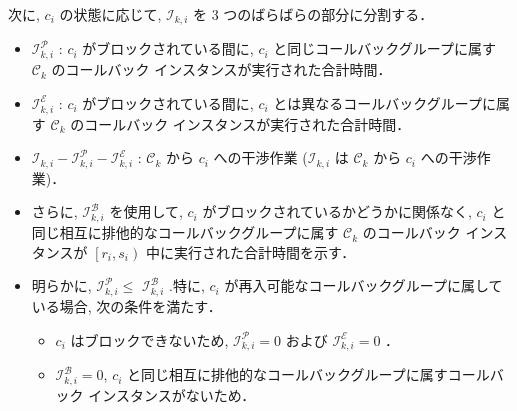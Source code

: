 \begin{frame}{}
    次に, $c_{i}$ の状態に応じて, $\mathcal{I}_{k, i}$ を 3 つのばらばらの部分に分割する．
    \begin{itemize}
        \item  $\mathcal{I}_{k, i}^{\mathcal{P}}$ : $c_{i}$ がブロックされている間に, $c_{i}$ と同じコールバックグループに属す $\mathcal{C}_{k}$ のコールバック インスタンスが実行された合計時間．

        \item  $\mathcal{I}_{k, i}^{\mathcal{E}}$ : $c_{i}$ がブロックされている間に, $c_{i}$ とは異なるコールバックグループに属す $\mathcal{C}_{k}$ のコールバック インスタンスが実行された合計時間．

        \item  $\mathcal{I}_{k, i}-\mathcal{I}_{k, i}^{\mathcal{P}}-\mathcal{I}_{k, i}^{\mathcal{E}}$ : $\mathcal{C}_{k}$ から $c_{i}$ への干渉作業 ($\mathcal{I}_{k, i}$ は $\mathcal{C}_{k}$ から $c_{i}$ への干渉作業)．
    \end{itemize}
\end{frame}

\begin{frame}{}
    \begin{itemize}
        \item さらに, $\mathcal{I}_{k, i}^{\mathcal{B}}$ を使用して, $c_{i}$ がブロックされているかどうかに関係なく, $c_{i}$ と同じ相互に排他的なコールバックグループに属す $\mathcal{C}_{k}$ のコールバック インスタンスが $\left[r_{i}, s_{i}\right)$ 中に実行された合計時間を示す．
        \item 明らかに, $\mathcal{I}_{k, i}^{\mathcal{P}} \leq$  $\mathcal{I}_{k, i}^{\mathcal{B}}$ .特に, $c_{i}$ が再入可能なコールバックグループに属している場合, 次の条件を満たす．

              \begin{itemize}
                  \item  $c_{i}$ はブロックできないため, $\mathcal{I}_{k, i}^{\mathcal{P}}=0$ および $\mathcal{I}_{k, i}^{\mathcal{E}}=0$ ．

                  \item  $\mathcal{I}_{k, i}^{\mathcal{B}}=0$, $c_{i}$ と同じ相互に排他的なコールバックグループに属すコールバック インスタンスがないため．

              \end{itemize}
    \end{itemize}
\end{frame}

